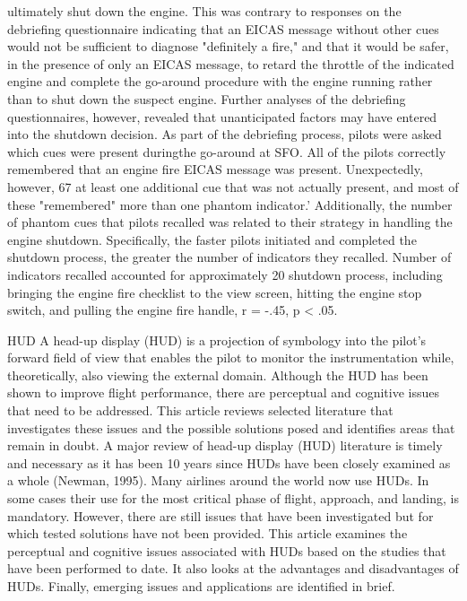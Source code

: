 \documentclass[utf8,bachelor,manualbib]{gradu3}
\begin{document}
ultimately shut down the engine. This was contrary to responses on the debriefing
questionnaire indicating that an EICAS message without other cues would not be
sufficient to diagnose "definitely a fire," and that it would be safer, in the presence
of only an EICAS message, to retard the throttle of the indicated engine and
complete the go-around procedure with the engine running rather than to shut down
the suspect engine. Further analyses of the debriefing questionnaires, however,
revealed that unanticipated factors may have entered into the shutdown decision.
As part of the debriefing process, pilots were asked which cues were present duringthe go-around at SFO. All of the pilots correctly remembered that an engine fire
EICAS message was present. Unexpectedly, however, 67%
at least one additional cue that was not actually present, and most of these
"remembered" more than one phantom indicator.' Additionally, the number of
phantom cues that pilots recalled was related to their strategy in handling the engine
shutdown. Specifically, the faster pilots initiated and completed the shutdown
process, the greater the number of indicators they recalled. Number of indicators
recalled accounted for approximately 20%
shutdown process, including bringing the engine fire checklist to the view screen,
hitting the engine stop switch, and pulling the engine fire handle, r = -.45, p < .05. \citep{mosier1998}

HUD
A head-up display (HUD) is a projection of symbology into the pilot’s forward field
of view that enables the pilot to monitor the instrumentation while, theoretically, also
viewing the external domain. Although the HUD has been shown to improve flight
performance, there are perceptual and cognitive issues that need to be addressed. This
article reviews selected literature that investigates these issues and the possible solutions
posed and identifies areas that remain in doubt.
A major review of head-up display (HUD) literature is timely and necessary as it
has been 10 years since HUDs have been closely examined as a whole
(Newman, 1995). Many airlines around the world now use HUDs. In some cases
their use for the most critical phase of flight, approach, and landing, is mandatory.
However, there are still issues that have been investigated but for which
tested solutions have not been provided. This article examines the perceptual
and cognitive issues associated with HUDs based on the studies that have been
performed to date. It also looks at the advantages and disadvantages of HUDs.
Finally, emerging issues and applications are identified in brief.
\citep{crawford2006}
\end{document}

